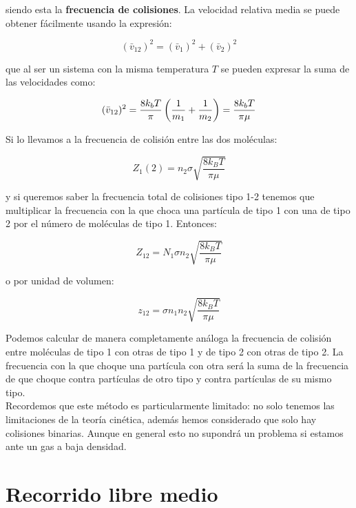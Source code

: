 \documentclass[12pt,a4paper,oneside]{book}
\begin{document}
siendo esta la \textbf{frecuencia de colisiones}. La velocidad relativa media se puede obtener fácilmente usando la expresión:

\begin{equation}
(\bar{v}_{12})^2 = (\bar{v}_1)^2 + (\bar{v}_2)^2
\end{equation}

que al ser un sistema con la misma temperatura $T$ se pueden expresar la suma de las velocidades como:

\begin{equation}
(\bar{v}_{12})^2 = \dfrac{8 k_b T}{\pi} \left( \frac{1}{m_1} + \frac{1}{m_2} \right) = \dfrac{8 k_b T}{\pi \mu} 
\end{equation}

Si lo llevamos a la frecuencia de colisión entre las dos moléculas:

\begin{equation}
Z_1 (2) = n_2 \sigma \sqrt{\frac{8 k_B T}{\pi \mu}}
\end{equation}

y si queremos saber la frecuencia total de colisiones tipo 1-2 tenemos que multiplicar la frecuencia con la que choca una partícula de tipo 1 con una de tipo 2 por el número de moléculas de tipo 1. Entonces:

\begin{equation}
Z_{12} = N_1 \sigma n_2  \sqrt{\frac{8 k_B T}{\pi \mu}}
\end{equation}

o por unidad de volumen:

\begin{equation}
z_{12} = \sigma n_1 n_2  \sqrt{\frac{8 k_B T}{\pi \mu}}
\end{equation}

Podemos calcular de manera completamente análoga la frecuencia de colisión entre moléculas de tipo 1 con otras de tipo 1 y de tipo 2 con otras de tipo 2. La frecuencia con la que choque una partícula con otra será la suma de la frecuencia de que choque contra partículas de otro tipo y contra partículas de su mismo tipo. \\

Recordemos que este método es particularmente limitado: no solo tenemos las limitaciones de la teoría cinética, además hemos considerado que solo hay colisiones binarias. Aunque en general esto no supondrá un problema si estamos ante un gas a baja densidad. 

\section{Recorrido libre medio}
\end{document}
